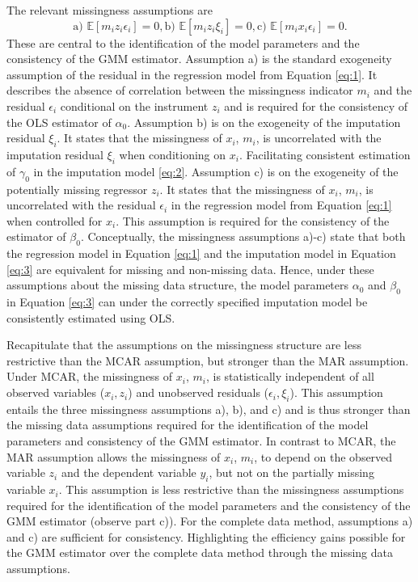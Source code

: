 The relevant missingness assumptions are $$\text{a) }\mathbb{E}[m_i z_i \epsilon_i] = 0, \text{b) }\mathbb{E}[m_i z_i \xi_i] = 0, \text{c) }\mathbb{E}[m_i x_i \epsilon_i] = 0.$$
These are central to the identification of the model parameters and the consistency of the GMM estimator.
Assumption a) is the standard exogeneity assumption of the residual in the regression model from Equation \eqref{eq:1}.
It describes the absence of correlation between the missingness indicator $m_i$ and the residual $\epsilon_i$ conditional on the instrument $z_i$ and is required for the consistency of the OLS estimator of $\alpha_0$.
Assumption b) is on the exogeneity of the imputation residual $\xi_i$.
It states that the missingness of $x_i$, $m_i$, is uncorrelated with the imputation residual $\xi_i$ when conditioning on $x_i$.
Facilitating consistent estimation of $\gamma_0$ in the imputation model \eqref{eq:2}.
Assumption c) is on the exogeneity of the potentially missing regressor $z_i$.
It states that the missingness of $x_i$, $m_i$, is uncorrelated with the residual $\epsilon_i$ in the regression model from Equation \eqref{eq:1} when controlled for $x_i$.
This assumption is required for the consistency of the estimator of $\beta_0$.
Conceptually, the missingness assumptions a)-c) state that both the regression model in Equation \eqref{eq:1} and the imputation model in Equation \eqref{eq:3} are equivalent for missing and non-missing data.
Hence, under these assumptions about the missing data structure, the model parameters $\alpha_0$ and $\beta_0$ in Equation \eqref{eq:3} can under the correctly specified imputation model be consistently estimated using OLS.

Recapitulate that the assumptions on the missingness structure are less restrictive than the MCAR assumption, but stronger than the MAR assumption.
Under MCAR, the missingness of $x_i$, $m_i$, is statistically independent of all observed variables ($x_i, z_i$) and unobserved residuals ($\epsilon_i, \xi_i$).
This assumption entails the three missingness assumptions a), b), and c) and is thus stronger than the missing data assumptions required for the identification of the model parameters and consistency of the GMM estimator.
In contrast to MCAR, the MAR assumption allows the missingness of $x_i$, $m_i$, to depend on the observed variable $z_i$ and the dependent variable $y_i$, but not on the partially missing variable $x_i$.
This assumption is less restrictive than the missingness assumptions required for the identification of the model parameters and the consistency of the GMM estimator (observe part c)).
For the complete data method, assumptions a) and c) are sufficient for consistency.
Highlighting the efficiency gains possible for the GMM estimator over the complete data method through the missing data assumptions.

